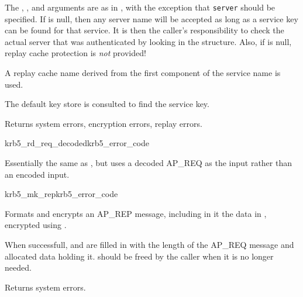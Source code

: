 The , ,  and
 arguments are as in , with
the exception that {\tt server} should be specified.  If
 is null, then any server name will be accepted as
long as a service key can be found for that service.  It is then the
caller's responsibility to check the actual server that was
authenticated by looking in the  structure.  Also,
if
 is null, replay cache protection is {\em not}
provided!  

A replay cache name derived from the first component of the service
name is used.

The default key store is consulted to find the service key.

Returns system errors, encryption errors, replay errors.


\begin{funcdecl}{krb5_rd_req_decoded}{krb5_error_code}{\funcin}
\funcendfuncarg
{}
\funcout
{}
\end{funcdecl}

Essentially the same as , but uses a decoded AP_REQ
as the input rather than an encoded input.

\begin{funcdecl}{krb5_mk_rep}{krb5_error_code}{\funcin}
\funcout
{}
\end{funcdecl}

Formats and encrypts an AP_REP message, including in it the data in
, encrypted using .

When successfull,  and
 are filled in with the length of the
AP_REQ message and allocated data holding it.
 should be freed by the
caller when it is no longer needed.

Returns system errors.

